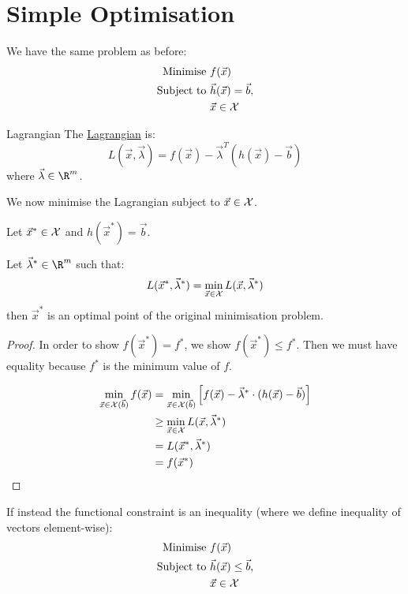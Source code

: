 \documentclass[../Main.tex]{subfiles}
\begin{document}
\section{Simple Optimisation}
We have the same problem as before:
\begin{align*}
    \text{Minimise } & f(\vec{x}) \\
    \text{Subject to } & \vec{h}(\vec{x}) = \vec{b}, \\
    & \vec{x} \in \mathcal{X}
\end{align*}
\begin{definition}{Lagrangian}
    The \underline{Lagrangian} is:
    \begin{equation*}
        L(\vec{x}, \vec{\lambda}) = f(\vec{x})- \vec{\lambda}^T (h(\vec{x}) - \vec{b})
    \end{equation*}
    where $\vec{\lambda} \in \R^m$.
\end{definition}
We now minimise the Lagrangian subject to $\vec{x} \in \mathcal{X}$.
\begin{theorem}
    Let $\vec{x}^* \in \mathcal{X}$ and $h(\vec{x}^*) = \vec{b}$.

    Let $\vec{\lambda}^* \in \R^m$ such that:
    \begin{equation*}
        L(\vec{x}^*, \vec{\lambda}^*) = \min_{\vec{x} \in \mathcal{X}} L(\vec{x}, \vec{\lambda}^*)
    \end{equation*}
    then $\vec{x}^*$ is an optimal point of the original minimisation problem.
    \label{thmLagrangeSufficiency}
\end{theorem}
\begin{proof}
    In order to show $f(\vec{x}^*) = f^*$, we show $f(\vec{x}^*) \leq f^*$. Then we must have equality because $f^*$ is the minimum value of $f$.

    \begin{align*}
        \min_{\vec{x} \in \mathcal{X}(\vec{b})} f(\vec{x}) &= \min_{\vec{x} \in \mathcal{X}(\vec{b})} \left[f(\vec{x}) - \vec{\lambda}^* \cdot (h(\vec{x}) - \vec{b})\right] \\
        &\geq \min_{\vec{x} \in \mathcal{X}} L(\vec{x}, \vec{\lambda}^*) \\
        &= L(\vec{x}^*, \vec{\lambda}^*) \\
        &= f(\vec{x}^*)
    \end{align*}
\end{proof}
If instead the functional constraint is an inequality (where we define inequality of vectors element-wise):
\begin{align*}
    \text{Minimise } & f(\vec{x}) \\
    \text{Subject to } & \vec{h}(\vec{x}) \leq \vec{b}, \\
    & \vec{x} \in \mathcal{X}
\end{align*}
\end{document}
